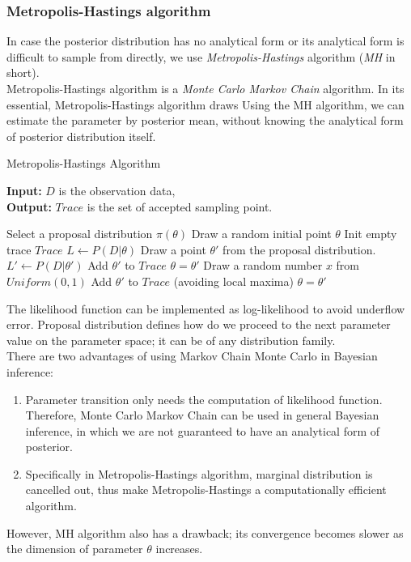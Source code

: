 \documentclass[12pt]{article}
\theoremstyle{definition}
\begin{document}
\subsubsection{Metropolis-Hastings algorithm}
In case the posterior distribution has no analytical form or its analytical form
is difficult to sample from directly, we use \textit{Metropolis-Hastings}
algorithm (\textit{MH} in short).\\
Metropolis-Hastings algorithm is a \textit{Monte Carlo Markov Chain} algorithm.
In its essential, Metropolis-Hastings algorithm draws 
Using the MH algorithm, we can estimate the parameter by posterior mean, without
knowing the analytical form of posterior distribution itself.

\begin{algorithm}[H]
  \caption{Metropolis-Hastings Algorithm}\label{mhalg}
  \hspace*{\algorithmicindent} \textbf{Input:} $D$ is the observation data, \\
  \hspace*{\algorithmicindent} \textbf{Output:} $Trace$ is the set of accepted
    sampling point.
  \begin{algorithmic}[1]
    \State Select a proposal distribution $\pi(\theta)$
    \State Draw a random initial point $\theta$
    \State Init empty trace $Trace$
    \State $L \leftarrow P(D|\theta)$
    \State Draw a point $\theta' $ from the proposal distribution.
    \State $L' \leftarrow P(D|\theta')$
    \State Add $\theta'$ to $Trace$
    \State $\theta = \theta'$
    \Else
    \State Draw a random number $x$ from $Uniform(0,1)$
    \State Add $\theta'$ to $Trace$ (avoiding local maxima)
    \State $\theta = \theta'$
    \EndIf
    \EndIf
    \EndWhile
    \EndProcedure
  \end{algorithmic}
\end{algorithm}
The likelihood function can be implemented as log-likelihood to avoid underflow
error. Proposal distribution defines how do we proceed to the next parameter
value on the parameter space; it can be of any distribution family.\\
There are two advantages of using Markov Chain Monte Carlo in Bayesian inference:
\begin{enumerate}
\item Parameter transition only needs the computation of likelihood function.
  Therefore, Monte Carlo Markov Chain can be used in general Bayesian inference,
  in which we are not guaranteed to have an analytical form of posterior.
\item Specifically in Metropolis-Hastings algorithm, marginal distribution is
  cancelled out, thus make Metropolis-Hastings a computationally efficient algorithm.
\end{enumerate}
However, MH algorithm also has a drawback; its convergence becomes slower as the
dimension of parameter $\theta$ increases.
\end{document}
